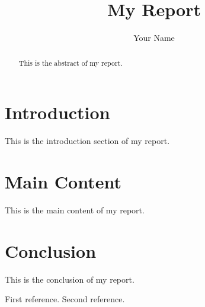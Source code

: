 \documentclass{article}
\begin{document}
\title{My Report}
\author{Your Name}

\maketitle

\begin{abstract}
This is the abstract of my report.
\end{abstract}

\section{Introduction}
This is the introduction section of my report.

\section{Main Content}
This is the main content of my report.

\section{Conclusion}
This is the conclusion of my report.

\begin{thebibliography}{9}
 First reference.
 Second reference.
\end{thebibliography}
\end{document}
